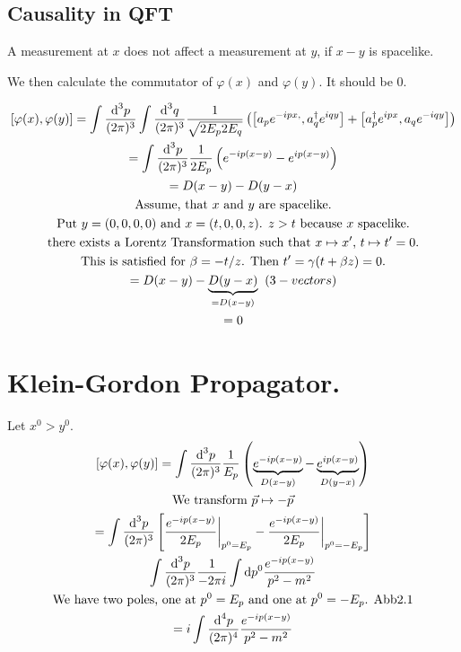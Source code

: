 \documentclass[]{scrartcl}
\begin{document}
\subsection{Causality in QFT}

A measurement at $x$ does not affect a measurement at $y$, if $x-y$ is spacelike.

We then calculate the commutator of $\varphi(x)$ and $\varphi(y)$. It should be $0$.

\begin{gather}
	\left[\varphi(x),\varphi(y)\right] = \int\frac{\text d^3p}{(2\pi)^3}\int\frac{\text d ^3q}{(2\pi)^3}\frac{1}{\sqrt{2E_p 2E_q}}\left(\left[a_p e^{-ipx,}, a_q^\dagger e^{iqy}\right] + \left[ a_p^\dagger e^{ipx}, a_q e^{-iqy}\right]\right)\\
	=\int\frac{\text d^3p}{(2\pi)^3}\frac{1}{2 E_p}\left(e^{-ip(x-y)} - e^{ip(x-y)}\right)\\
	= D(x-y) - D(y-x)\\
	\text{Assume, that $x$ and $y$ are spacelike.}\nonumber\\
	\text{Put $y = (0,0,0,0)$ and $x = (t,0,0,z)$. $z>t$ because $x$ spacelike.}\nonumber\\
	\text{there exists a Lorentz Transformation such that $x\mapsto x'$, $t\mapsto t' = 0$.}\nonumber\\
	\text{This is satisfied for $\beta = -t/z$. Then $t' = \gamma(t + \beta z) = 0.$}\nonumber\\
	= D(x-y) - \underbrace{D(y-x)}_{= D(x-y)}\;\;(3-vectors)\\
	= 0
\end{gather}


\section{Klein-Gordon Propagator.}

Let $x^0 > y^0$. 
\begin{gather}
	\left[\varphi(x),\varphi(y)\right] = \int\frac{\text d ^3p}{(2\pi)^3}\frac{1}{E_p}\left(\underbrace{e^{-ip(x-y)}}_{D(x-y)} - \underbrace{e^{ip(x-y)}}_{D(y-x)}\right)\\
\text{We transform $\vec p \mapsto - \vec p$}\nonumber\\
=\int\frac{\text d^3p}{(2\pi)^3}\left[\frac{e^{-ip(x-y)}}{2E_p} \bigg\rvert_{p^0 = E_p} - \frac{e^{-ip(x-y)}}{2E_p}\bigg\rvert_{p^0 = -E_p}\right]\\
\int \frac{\text d^3p}{(2\pi)^3}\frac{1}{-2\pi i}\int \text d p^0 \frac{e^{-ip(x-y)}}{p^2-m^2}\\
\text{We have two poles, one at $p^0 = E_p$ and one at $p^0 = -E_p$. Abb2.1} \nonumber\\
= i\int\frac{\text d^4p}{(2\pi)^4}\frac{e^{-ip(x-y)}}{p^2-m^2}
\end{gather}
\end{document}

